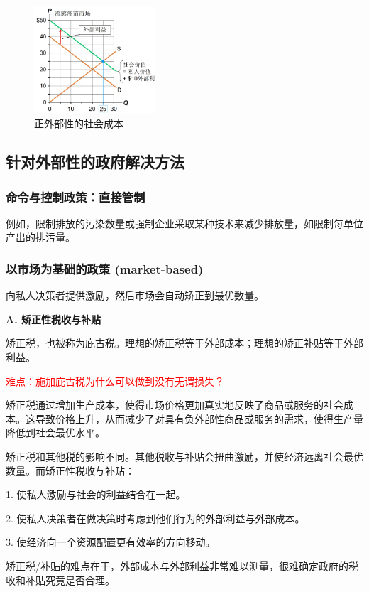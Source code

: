\documentclass[12pt, a4paper]{article}
\begin{document}
\begin{figure}[H]
  \centering
  \includegraphics[width=0.4\textwidth]{正外部性.png}
  \caption{正外部性的社会成本}
\end{figure}

\subsection{针对外部性的政府解决方法}
\subsubsection{命令与控制政策：直接管制}
例如，限制排放的污染数量或强制企业采取某种技术来减少排放量，如限制每单位产出的排污量。

\subsubsection{以市场为基础的政策 (market-based)}
向私人决策者提供激励，然后市场会自动矫正到最优数量。

\textbf{A. 矫正性税收与补贴}

矫正税，也被称为庇古税。理想的矫正税等于外部成本；理想的矫正补贴等于外部利益。

\textcolor{red}{难点：施加庇古税为什么可以做到没有无谓损失？}

矫正税通过增加生产成本，使得市场价格更加真实地反映了商品或服务的社会成本。这导致价格上升，从而减少了对具有负外部性商品或服务的需求，使得生产量降低到社会最优水平。

矫正税和其他税的影响不同。其他税收与补贴会扭曲激励，并使经济远离社会最优数量。而矫正性税收与补贴：

1. 使私人激励与社会的利益结合在一起。

2. 使私人决策者在做决策时考虑到他们行为的外部利益与外部成本。

3. 使经济向一个资源配置更有效率的方向移动。

矫正税/补贴的难点在于，外部成本与外部利益非常难以测量，很难确定政府的税收和补贴究竟是否合理。
\end{document}
